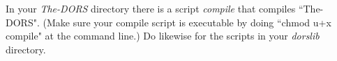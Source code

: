 \documentclass[12pt]{article}
\begin{document}
 In your {\it The-DORS} directory there 
is a script {\it compile} that compiles ``The-DORS". (Make sure your compile script is executable by doing ``chmod u+x compile"
at the command line.) Do likewise for the scripts in 
your {\it dorslib} directory.







\end{document}
